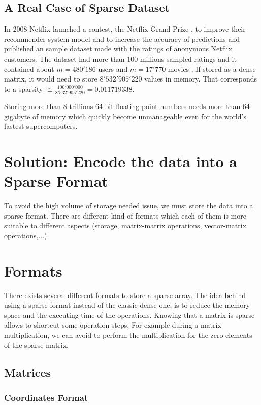 \subsection{A Real Case of Sparse Dataset}
In 2008 Netflix launched a contest, the Netflix Grand Prize \cite{netflixgrandprize}, to improve their recommender system model and to increase the accuracy of predictions and published an sample dataset made with the ratings of anonymous Netflix customers. The dataset had more than 100 millions sampled ratings and it contained about $m=480'186$ users and $m=17'770$ movies \cite{Koren091the}. If stored as a dense matrix, it would need to store $8'532'905'220$ values in memory. That corresponds to a sparsity $\cong \frac{100'000'000}{8'532'905'220} = 0.011719338$.

Storing more than 8 trillions 64-bit floating-point numbers needs more than 64 gigabyte of memory which quickly become unmanageable even for the world's fastest supercomputers. 

\section{Solution: Encode the data into a Sparse Format}

To avoid the high volume of storage needed issue, we must store the data into a sparse format. There are different kind of formats which each of them is more suitable to different aspects (storage, matrix-matrix operations, vector-matrix operations,...)



\section{Formats}

There exists several different formats to store a sparse array. The idea behind using a sparse format instead of the classic dense one, is to reduce the memory space and the executing time of the operations. Knowing that a matrix is sparse allows to shortcut some operation steps. For example during a matrix multiplication, we can avoid to perform the multiplication for the zero elements of the sparse matrix.

\subsection{Matrices}
\subsubsection{Coordinates Format}

